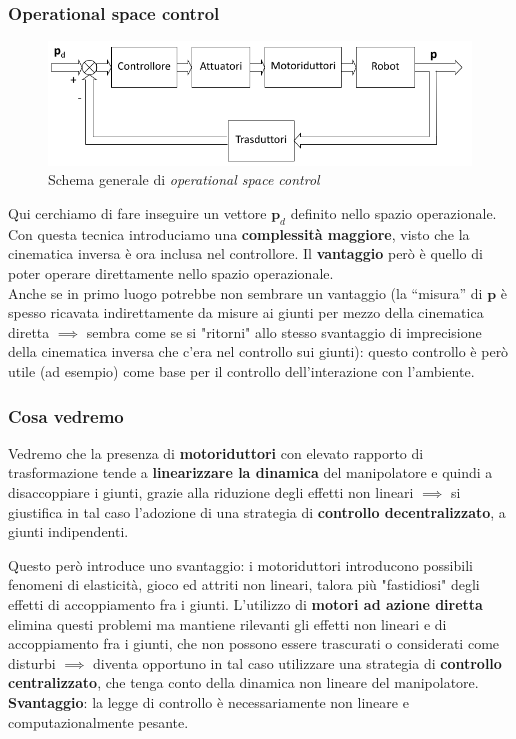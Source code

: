 \subsubsection{Operational space control}
\begin{figure}[ht!]
	\centering
	\includegraphics[width=0.7\linewidth]{images/operational_control_1}
	\caption{Schema generale di \textit{operational space control}}
	\label{fig:operationalcontrol1}
\end{figure}

Qui cerchiamo di fare inseguire un vettore $\mathbf{p}_d$ definito nello spazio operazionale. Con questa tecnica introduciamo una \textbf{complessità maggiore}, visto che la cinematica inversa è ora inclusa nel controllore. Il \textbf{vantaggio} però è quello di poter operare direttamente nello spazio operazionale.\\
Anche se in primo luogo potrebbe non sembrare un vantaggio (la “misura” di $\mathbf{p}$ è spesso ricavata indirettamente da misure ai giunti per mezzo della cinematica diretta $\implies$ sembra come se si "ritorni" allo stesso svantaggio di imprecisione della cinematica inversa che c'era nel controllo sui giunti): questo controllo è però utile (ad esempio) come base per il controllo dell’interazione con l’ambiente.\\

\subsubsection{Cosa vedremo}
Vedremo che la presenza di \textbf{motoriduttori} con elevato rapporto di trasformazione tende a \textbf{linearizzare la dinamica} del manipolatore e quindi a disaccoppiare i giunti, grazie alla riduzione degli effetti non lineari $\implies$ si giustifica in tal caso l’adozione di una strategia di \textbf{controllo decentralizzato}, a giunti indipendenti. 

Questo però introduce uno svantaggio: i motoriduttori introducono possibili fenomeni di elasticità, gioco ed attriti non lineari, talora più "fastidiosi" degli effetti di accoppiamento fra i giunti. L’utilizzo di \textbf{motori ad azione diretta} elimina questi problemi ma mantiene rilevanti gli effetti non lineari e di accoppiamento fra i giunti, che non possono essere trascurati o considerati come disturbi $\implies$ diventa opportuno in tal caso utilizzare una strategia di \textbf{controllo centralizzato}, che tenga conto della dinamica non lineare del manipolatore. \textbf{Svantaggio}: la legge di controllo è necessariamente non lineare e computazionalmente pesante.





